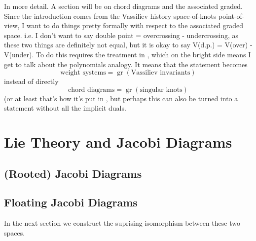 \documentclass[12pt]{report}
\theoremstyle{regular}
\newcommand{\scaffold}[1]{
\begin{mdframed}[style=scaffold]
        {\color{teal}#1}
\end{mdframed}
}
\begin{document}
        \scaffold{In more detail. A section will be on chord diagrams and the associated graded. Since the introduction comes from the Vassiliev history space-of-knots point-of-view, I want to do things pretty formally with respect to the associated graded space. i.e. I don't want to say double point = overcrossing - undercrossing, as these two things are definitely not equal, but it is okay to say V(d.p.) = V(over) - V(under). To do this requires the treatment in \cite{the-fundamental-theorem-of-vassiliev-invariants}, which on the bright side means I get to talk about the polynomials analogy. It means that the statement becomes \[\text{weight systems} = \operatorname{gr}(\text{Vassiliev invariants})\] instead of directly \[\text{chord diagrams} = \operatorname{gr}(\text{singular knots})\] (or at least that's how it's put in \cite{the-fundamental-theorem-of-vassiliev-invariants}, but perhaps this can also be turned into a statement without all the implicit duals.}



        \chapter{Lie Theory and Jacobi Diagrams}
        \label{ch:lie-theory-and-jocobi-diagrams}

        \section{(Rooted) Jacobi Diagrams}

        \section{Floating Jacobi Diagrams}

        \scaffold{In the next section we construct the suprising isomorphism between these two spaces.}
\end{document}
